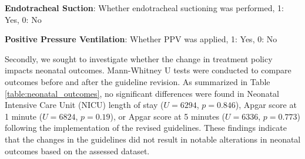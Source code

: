 \documentclass[11pt]{article}
\begin{document}
\begin{table}[h]
\caption{Test of association between treatment policy change and neonatal treatments}
\label{table:neonatal_treatments}
\begin{threeparttable}
\renewcommand{\TPTminimum}{\linewidth}
\begin{tablenotes}
\footnotesize
\item \textbf{Endotracheal Suction}: Whether endotracheal suctioning was performed, 1: Yes, 0: No
\item \textbf{Positive Pressure Ventilation}: Whether PPV was applied, 1: Yes, 0: No
\end{tablenotes}
\end{threeparttable}
\end{table}


Secondly, we sought to investigate whether the change in treatment policy impacts neonatal outcomes. Mann-Whitney U tests were conducted to compare outcomes before and after the guideline revision. As summarized in Table \ref{table:neonatal_outcomes}, no significant differences were found in Neonatal Intensive Care Unit (NICU) length of stay ($U = 6294$, $p = 0.846$), Apgar score at 1 minute ($U = 6824$, $p = 0.19$), or Apgar score at 5 minutes ($U = 6336$, $p = 0.773$) following the implementation of the revised guidelines. These findings indicate that the changes in the guidelines did not result in notable alterations in neonatal outcomes based on the assessed dataset.
\end{document}
